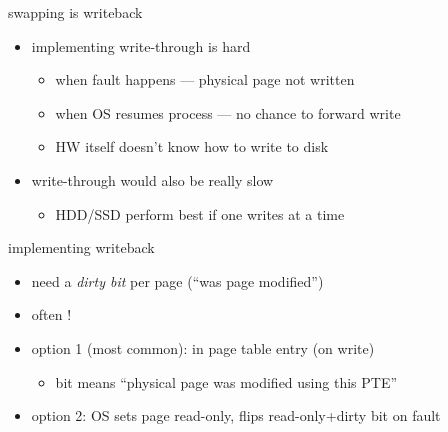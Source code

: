 \begin{frame}{swapping is writeback}
\begin{itemize}
\item implementing write-through is hard
\begin{itemize}
    \item when fault happens --- physical page not written
    \item when OS resumes process --- no chance to forward write
    \item HW itself doesn't know how to write to disk
\end{itemize}
\item write-through would also be really slow
\begin{itemize}
    \item HDD/SSD perform best if one writes  at a time
\end{itemize}
\end{itemize}
\end{frame}

\begin{frame}{implementing writeback}
\begin{itemize}
\item need a \textit{dirty bit} per page (``was page modified'')
\item often !
\vspace{.5cm}
\item option 1 (most common):  in page table entry (on write)
    \begin{itemize}
        \item bit means ``physical page was modified using this PTE''
    \end{itemize}
\item option 2: OS sets page read-only, flips read-only+dirty bit on fault
\end{itemize}
\end{frame}

